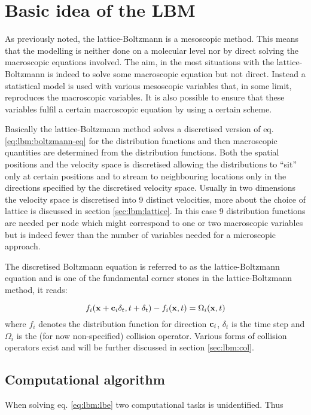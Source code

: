 \section{Basic idea of the LBM}
As previously noted, the lattice-Boltzmann is a mesoscopic
method. This means that the modelling is neither done on a molecular
level nor by direct solving the macroscopic equations involved. The
aim, in the most situations with the lattice-Boltzmann is indeed to
solve some macroscopic equation but not direct. Instead a statistical
model is used with various mesoscopic variables that, in some limit,
reproduces the macroscopic variables. It is also possible to ensure
that these variables fulfil a certain macroscopic equation by using a
certain scheme.

Basically the lattice-Boltzmann method solves a discretised version of
eq. \eqref{eq:lbm:boltzmann-eq} for the distribution functions and
then macroscopic quantities are determined from the distribution
functions. Both the spatial positions and the velocity space is
discretised allowing the distributions to ``sit'' only at certain
positions and to stream to neighbouring locations only in the
directions specified by the discretised velocity space. Usually in two
dimensions the velocity space is discretised into 9 distinct
velocities, more about the choice of lattice is discussed in section
\ref{sec:lbm:lattice}. In this case 9 distribution functions are
needed per node which might correspond to one or two macroscopic
variables but is indeed fewer than the number of variables needed for
a microscopic approach.

The discretised Boltzmann equation is referred to as the
lattice-Boltzmann equation and is one of the fundamental corner stones
in the lattice-Boltzmann method, it reads:

\begin{equation}\label{eq:lbm:lbe}
f_i(\mathbf{x} + \mathbf{c}_i\delta_t, t + \delta_t) - f_i(\mathbf{x}, t) = \Omega_i(\mathbf{x}, t)
\end{equation}
where $f_i$ denotes the distribution function for direction $\mathbf{c}_i$,
$\delta_t$ is the time step and $\Omega_i$ is the (for
now non-specified) collision operator. Various forms of collision
operators exist and will be further discussed in section
\ref{sec:lbm:col}.

\subsection{Computational algorithm}
When solving eq. \eqref{eq:lbm:lbe} two computational tasks is
unidentified. Thus  

